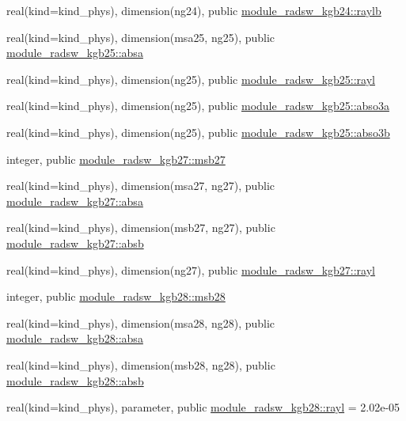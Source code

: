 \begin{DoxyCompactItemize}
\item 
real(kind=kind\+\_\+phys), dimension(ng24), public \hyperlink{group__module__radsw__main_ga927fc4a43727d3e0735448c1cdc60458}{module\+\_\+radsw\+\_\+kgb24\+::raylb}
\item 
real(kind=kind\+\_\+phys), dimension(msa25, ng25), public \hyperlink{group__module__radsw__main_gaf4daf474954d4689219ada6d0662aceb}{module\+\_\+radsw\+\_\+kgb25\+::absa}
\item 
real(kind=kind\+\_\+phys), dimension(ng25), public \hyperlink{group__module__radsw__main_ga3d32a0d74d03129cacd9c4bb2e58683a}{module\+\_\+radsw\+\_\+kgb25\+::rayl}
\item 
real(kind=kind\+\_\+phys), dimension(ng25), public \hyperlink{group__module__radsw__main_gab02765dac8ca71a439cdaf1ed2691851}{module\+\_\+radsw\+\_\+kgb25\+::abso3a}
\item 
real(kind=kind\+\_\+phys), dimension(ng25), public \hyperlink{group__module__radsw__main_ga2844cade392c8805b1d418bc1260b3a5}{module\+\_\+radsw\+\_\+kgb25\+::abso3b}
\item 
integer, public \hyperlink{group__module__radsw__main_ga3b2e57a0d4596aead5cad5aaca74850d}{module\+\_\+radsw\+\_\+kgb27\+::msb27}
\item 
real(kind=kind\+\_\+phys), dimension(msa27, ng27), public \hyperlink{group__module__radsw__main_ga300726e54369a14bfbe6b486f5aab01b}{module\+\_\+radsw\+\_\+kgb27\+::absa}
\item 
real(kind=kind\+\_\+phys), dimension(msb27, ng27), public \hyperlink{group__module__radsw__main_ga8edb349c908e6950e0d18f293dd1b6ea}{module\+\_\+radsw\+\_\+kgb27\+::absb}
\item 
real(kind=kind\+\_\+phys), dimension(ng27), public \hyperlink{group__module__radsw__main_gaca4c6e06d1cd46568048a035c6726f1d}{module\+\_\+radsw\+\_\+kgb27\+::rayl}
\item 
integer, public \hyperlink{group__module__radsw__main_ga55d73e39264b431135c6a9c809e20a94}{module\+\_\+radsw\+\_\+kgb28\+::msb28}
\item 
real(kind=kind\+\_\+phys), dimension(msa28, ng28), public \hyperlink{group__module__radsw__main_ga5e48daf035b3b22b6e1b0f36aabcec10}{module\+\_\+radsw\+\_\+kgb28\+::absa}
\item 
real(kind=kind\+\_\+phys), dimension(msb28, ng28), public \hyperlink{group__module__radsw__main_gac3834ddd9d9e2106dc739094c800d09b}{module\+\_\+radsw\+\_\+kgb28\+::absb}
\item 
real(kind=kind\+\_\+phys), parameter, public \hyperlink{group__module__radsw__main_gaf3641febf88e97741b2cd86a56eda843}{module\+\_\+radsw\+\_\+kgb28\+::rayl} = 2.\+02e-\/05

\end{DoxyCompactItemize}
